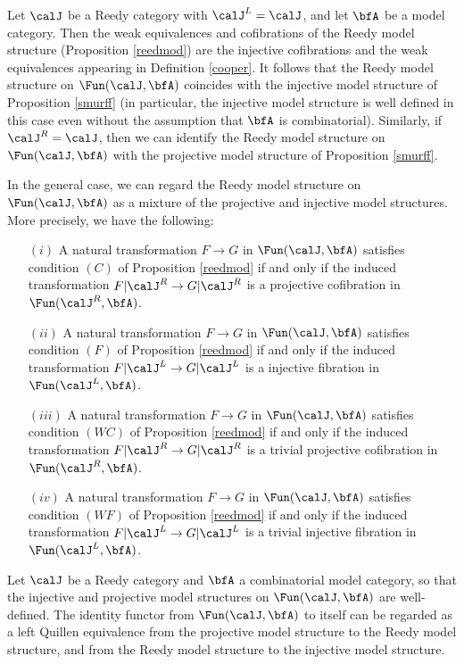 \begin{example}\label{sued}
Let $\calJ$ be a Reedy category with $\calJ^{L} = \calJ$, and let
$\bfA$ be a model category. Then the weak equivalences and cofibrations of the
Reedy model structure (Proposition \ref{reedmod}) are the injective cofibrations and the
weak equivalences appearing in Definition \ref{cooper}. It follows that the Reedy model structure on $\Fun(\calJ, \bfA)$ coincides with the injective model structure of Proposition \ref{smurff} (in particular, the injective model structure is well defined in this case even without the assumption that $\bfA$ is combinatorial). Similarly, if $\calJ^{R} = \calJ$, then we can identify the Reedy model structure on $\Fun(\calJ, \bfA)$ with the projective model structure of Proposition \ref{smurff}.

In the general case, we can regard the Reedy model structure on $\Fun(\calJ, \bfA)$ as
a mixture of the projective and injective model structures. More precisely, we have the following:
\begin{itemize}
\item[$(i)$] A natural transformation $F \rightarrow G$ in $\Fun(\calJ, \bfA)$ satisfies
condition $(C)$ of Proposition \ref{reedmod} if and only if the induced transformation
$F|\calJ^{R} \rightarrow G| \calJ^{R}$ is a projective cofibration in $\Fun(\calJ^{R}, \bfA)$.
\item[$(ii)$] A natural transformation $F \rightarrow G$ in $\Fun(\calJ, \bfA)$ satisfies
condition $(F)$ of Proposition \ref{reedmod} if and only if the induced transformation
$F|\calJ^{L} \rightarrow G| \calJ^{L}$ is a injective fibration in $\Fun(\calJ^{L}, \bfA)$.
\item[$(iii)$] A natural transformation $F \rightarrow G$ in $\Fun(\calJ, \bfA)$ satisfies
condition $(WC)$ of Proposition \ref{reedmod} if and only if the induced transformation
$F|\calJ^{R} \rightarrow G| \calJ^{R}$ is a trivial projective cofibration in $\Fun(\calJ^{R}, \bfA)$.
\item[$(iv)$] A natural transformation $F \rightarrow G$ in $\Fun(\calJ, \bfA)$ satisfies
condition $(WF)$ of Proposition \ref{reedmod} if and only if the induced transformation
$F|\calJ^{L} \rightarrow G| \calJ^{L}$ is a trivial injective fibration in $\Fun(\calJ^{L}, \bfA)$.
\end{itemize}
\end{example}

\begin{remark}
Let $\calJ$ be a Reedy category and $\bfA$ a combinatorial model category, so that
the injective and projective model structures on $\Fun( \calJ, \bfA)$ are well-defined.
The identity functor from $\Fun(\calJ, \bfA)$ to itself can be regarded as a left Quillen equivalence from the projective model structure to the Reedy model structure, and from the
Reedy model structure to the injective model structure.
\end{remark}

